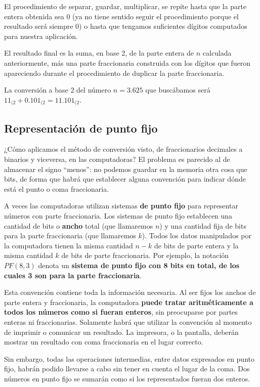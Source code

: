 \documentclass[spanish,A4,]{article}
\begin{document}
El procedimiento de separar, guardar, multiplicar, se repite hasta que
la parte entera obtenida sea 0 (ya no tiene sentido seguir el
procedimiento porque el resultado será siempre 0) o hasta que tengamos
suficientes dígitos computados para nuestra aplicación.

El resultado final es la suma, en base 2, de la parte entera de $n$
calculada anteriormente, más una parte fraccionaria construida con los
dígitos que fueron apareciendo durante el procedimiento de duplicar la
parte fraccionaria.

La conversión a base 2 del número $n = 3.625$ que buscábamos será
$11_{(2} + 0.101_{(2} = 11.101_{(2}$.

\subsection{Representación de punto
fijo}\label{representaciuxf3n-de-punto-fijo}

¿Cómo aplicamos el método de conversión visto, de fraccionarios
decimales a binarios y viceversa, en las computadoras? El problema es
parecido al de almacenar el signo ``menos'': no podemos guardar en la
memoria otra cosa que bits, de forma que habrá que establecer alguna
convención para indicar dónde está el punto o coma fraccionaria.

A veces las computadoras utilizan sistemas \textbf{de punto fijo} para
representar números con parte fraccionaria. Los sistemas de punto fijo
establecen una cantidad de bits o \textbf{ancho} total (que llamaremos
$n$) y una cantidad fija de bits para la parte fraccionaria (que
llamaremos $k$). Todos los datos manipulados por la computadora tienen
la misma cantidad $n-k$ de bits de parte entera y la misma cantidad $k$
de bits de parte fraccionaria. Por ejemplo, la notación $PF(8,3)$ denota
un \textbf{sistema de punto fijo con 8 bits en total, de los cuales 3
son para la parte fraccionaria}.

Esta convención contiene toda la información necesaria. Al ser fijos los
anchos de parte entera y fraccionaria, la computadora \textbf{puede
tratar aritméticamente a todos los números como si fueran enteros}, sin
preocuparse por partes enteras ni fraccionarias. Solamente habrá que
utilizar la convención al momento de imprimir o comunicar un resultado.
La impresora, o la pantalla, deberán mostrar un resultado con coma
fraccionaria en el lugar correcto.

Sin embargo, todas las operaciones intermedias, entre datos expresados
en punto fijo, habrán podido llevarse a cabo sin tener en cuenta el
lugar de la coma. Dos números en punto fijo se sumarán como si los
representados fueran dos enteros.
\end{document}
